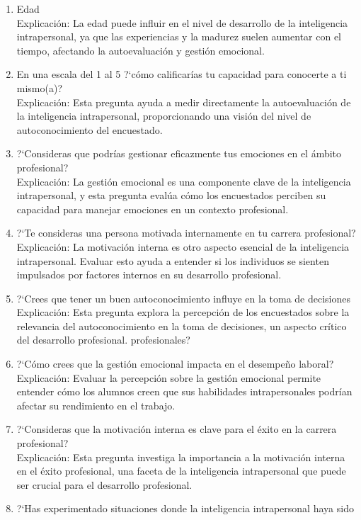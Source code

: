 \begin{enumerate}
\item Edad\\
Explicación: La edad puede influir en el nivel de desarrollo de la inteligencia intrapersonal, ya que las experiencias y la madurez suelen aumentar con el tiempo, afectando la autoevaluación y gestión emocional.
\item En una escala del 1 al 5 ?`c\'omo calificar\'ias tu capacidad para conocerte
a ti mismo(a)?\\
Explicación: Esta pregunta ayuda a medir directamente la autoevaluación de la inteligencia intrapersonal, proporcionando una visión del nivel de autoconocimiento del encuestado.
\item ?`Consideras que podr\'ias gestionar eficazmente tus emociones en el \'ambito
profesional?\\
Explicación: La gestión emocional es una componente clave de la inteligencia intrapersonal, y esta pregunta evalúa cómo los encuestados perciben su capacidad para manejar emociones en un contexto profesional.
\item ?`Te consideras una persona motivada internamente en tu carrera profesional?\\
Explicación: La motivación interna es otro aspecto esencial de la inteligencia intrapersonal. Evaluar esto ayuda a entender si los individuos se sienten impulsados por factores internos en su desarrollo profesional.
\item ?`Crees que tener un buen autoconocimiento influye en la toma de decisiones
Explicación: Esta pregunta explora la percepción de los encuestados sobre la relevancia del autoconocimiento en la toma de decisiones, un aspecto crítico del desarrollo profesional.
profesionales?\\
\item ?`C\'omo crees que la gesti\'on emocional impacta en el desempe\~no laboral?\\
Explicación: Evaluar la percepción sobre la gestión emocional permite entender cómo los alumnos creen que sus habilidades intrapersonales podrían afectar su rendimiento en el trabajo.
\item ?`Consideras que la motivaci\'on interna es clave para el \'exito en la carrera profesional?\\
Explicación: Esta pregunta investiga la importancia a la motivación interna en el éxito profesional, una faceta de la inteligencia intrapersonal que puede ser crucial para el desarrollo profesional.
\item ?`Has experimentado situaciones donde la inteligencia intrapersonal haya sido

\end{enumerate}
